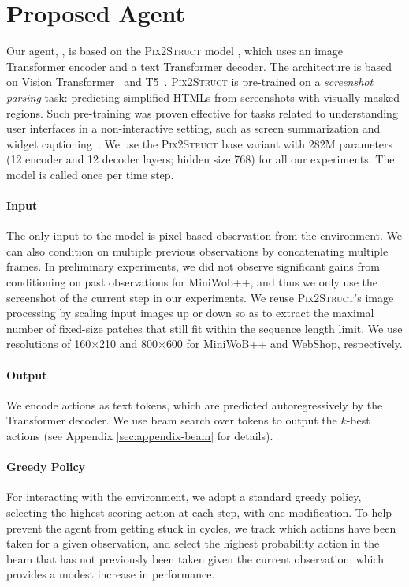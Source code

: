 
\section{Proposed Agent}
\label{sec:agent}

Our agent, \ours, is based on the \textsc{Pix2Struct}
model \citep{lee2022pix2struct}, which uses an image Transformer encoder and a text Transformer decoder. The architecture is based on Vision Transformer~\citep{vit} and T5~\citep{raffel2019exploring}. \textsc{Pix2Struct} is pre-trained on a \emph{screenshot parsing} task: predicting simplified HTMLs from screenshots with visually-masked regions. Such pre-training was proven effective for tasks related to understanding user interfaces in a non-interactive setting, such as screen summarization and widget captioning~\citep{screen2words, li-etal-2020-widget}.
We use the \textsc{Pix2Struct} base
variant with 282M parameters (12 encoder and 12
decoder layers; hidden size 768) for all our experiments. The model is called once per time step.




\paragraph{Input} The only input to the model is pixel-based observation from the environment. We can also condition on multiple previous observations by concatenating multiple frames. In preliminary experiments, we did not observe significant gains from conditioning on past observations for MiniWob++, and thus we only use the screenshot of the current step in our experiments.
We reuse \textsc{Pix2Struct}'s image processing by scaling input images up or down so as to extract the maximal number of fixed-size patches that still fit within the sequence length limit. We use resolutions of 160$\times$210 and 800$\times$600 for MiniWoB++ and WebShop, respectively.

\paragraph{Output} We encode actions as text tokens, which are predicted autoregressively by the Transformer decoder. We use beam search over tokens to output the $k$-best actions (see Appendix \ref{sec:appendix-beam} for details).

\paragraph{Greedy Policy} For interacting with the environment, we adopt a standard greedy policy, selecting the highest scoring action at each step, with one modification. To help prevent the agent from getting stuck in cycles, we track which actions have been taken for a given observation, and select the highest probability action in the beam that has not previously been taken given the current observation, which provides a modest increase in performance.

